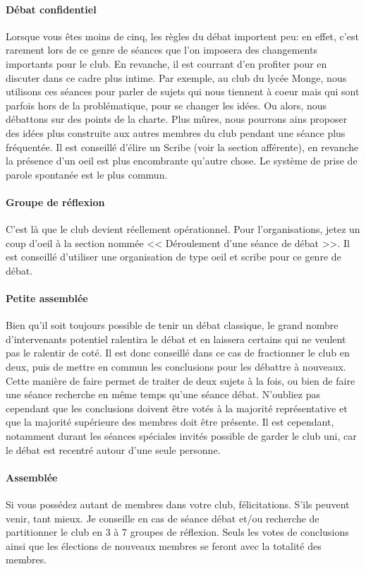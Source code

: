 \documentclass[a4paper,12pt]{article}
\begin{document}
\paragraph{Débat confidentiel}
Lorsque vous êtes moins de cinq, les règles du débat importent peu: en effet, c'est rarement lors de ce genre de séances que l'on imposera des changements importants pour le club. En revanche, il est courrant d'en profiter pour en discuter dans ce cadre plus intime. Par exemple, au club du lycée Monge, nous utilisons ces séances pour parler de sujets qui nous tiennent à coeur mais qui sont parfois hors de la problématique, pour se changer les idées. Ou alors, nous débattons sur des points de la charte. Plus mûres, nous pourrons ains proposer des idées plus construite aux autres membres du club pendant une séance plus fréquentée. Il est conseillé d'élire un Scribe (voir la section afférente), en revanche la présence d'un oeil est plus encombrante qu'autre chose. Le système de prise de parole spontanée est le plus commun.

\paragraph{Groupe de réflexion}
C'est là que le club devient réellement opérationnel. Pour l'organisations, jetez un coup d'oeil à la section nommée << Déroulement d'une séance de débat >>. Il est conseillé d'utiliser une organisation de type oeil et scribe pour ce genre de débat. 

\paragraph{Petite assemblée}
Bien qu'il soit toujours possible de tenir un débat classique, le grand nombre d'intervenants potentiel ralentira le débat et en laissera certains qui ne veulent pas le ralentir de coté. Il est donc conseillé dans ce cas de fractionner le club en deux, puis de mettre en commun les conclusions pour les débattre à nouveaux. Cette manière de faire permet de traiter de deux sujets à la fois, ou bien de faire une séance recherche en même temps qu'une séance débat. N'oubliez pas cependant que les conclusions doivent être votés à la majorité représentative et que la majorité supérieure des membres doit être présente. Il est cependant, notamment durant les séances spéciales invités possible de garder le club uni, car le débat est recentré autour d'une seule personne.

\paragraph{Assemblée}
Si vous possédez autant de membres dans votre club, félicitations. S'ils peuvent venir, tant mieux. Je conseille en cas de séance débat et/ou recherche de partitionner le club en 3 à 7 groupes de réflexion.
Seuls les votes de conclusions ainsi que les élections de nouveaux membres se feront avec la totalité des membres.
\end{document}
